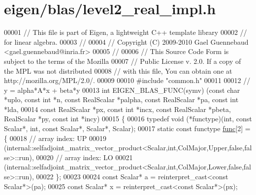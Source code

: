 \hypertarget{eigen_2blas_2level2__real__impl_8h_source}{}\section{eigen/blas/level2\+\_\+real\+\_\+impl.h}
\label{eigen_2blas_2level2__real__impl_8h_source}

\begin{DoxyCode}
00001 \textcolor{comment}{// This file is part of Eigen, a lightweight C++ template library}
00002 \textcolor{comment}{// for linear algebra.}
00003 \textcolor{comment}{//}
00004 \textcolor{comment}{// Copyright (C) 2009-2010 Gael Guennebaud <gael.guennebaud@inria.fr>}
00005 \textcolor{comment}{//}
00006 \textcolor{comment}{// This Source Code Form is subject to the terms of the Mozilla}
00007 \textcolor{comment}{// Public License v. 2.0. If a copy of the MPL was not distributed}
00008 \textcolor{comment}{// with this file, You can obtain one at http://mozilla.org/MPL/2.0/.}
00009 
00010 \textcolor{preprocessor}{#include "common.h"}
00011 
00012 \textcolor{comment}{// y = alpha*A*x + beta*y}
00013 \textcolor{keywordtype}{int} EIGEN\_BLAS\_FUNC(symv) (\textcolor{keyword}{const} \textcolor{keywordtype}{char} *uplo, \textcolor{keyword}{const} \textcolor{keywordtype}{int} *n, \textcolor{keyword}{const} RealScalar *palpha, \textcolor{keyword}{const} RealScalar *pa, \textcolor{keyword}{
      const} \textcolor{keywordtype}{int} *lda,
00014                            \textcolor{keyword}{const} RealScalar *px, \textcolor{keyword}{const} \textcolor{keywordtype}{int} *incx, \textcolor{keyword}{const} RealScalar *pbeta, RealScalar *py, \textcolor{keyword}{
      const} \textcolor{keywordtype}{int} *incy)
00015 \{
00016   \textcolor{keyword}{typedef} void (*functype)(int, \textcolor{keyword}{const} Scalar*, int, \textcolor{keyword}{const} Scalar*, Scalar*, Scalar);
00017   \textcolor{keyword}{static} \textcolor{keyword}{const} functype \hyperlink{structfunc}{func}[2] = \{
00018     \textcolor{comment}{// array index: UP}
00019     (internal::selfadjoint\_matrix\_vector\_product<Scalar,int,ColMajor,Upper,false,false>::run),
00020     \textcolor{comment}{// array index: LO}
00021     (internal::selfadjoint\_matrix\_vector\_product<Scalar,int,ColMajor,Lower,false,false>::run),
00022   \};
00023 
00024   \textcolor{keyword}{const} Scalar* a = \textcolor{keyword}{reinterpret\_cast<}\textcolor{keyword}{const }Scalar*\textcolor{keyword}{>}(pa);
00025   \textcolor{keyword}{const} Scalar* x = \textcolor{keyword}{reinterpret\_cast<}\textcolor{keyword}{const }Scalar*\textcolor{keyword}{>}(px);

\end{DoxyCode}
